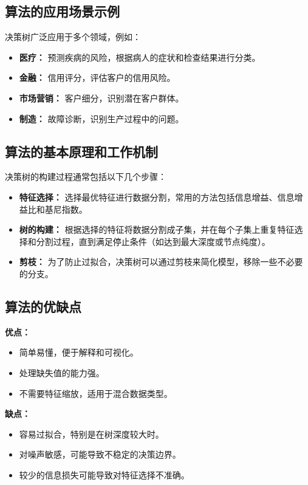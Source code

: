 \subsection*{算法的应用场景示例}
决策树广泛应用于多个领域，例如：
\begin{itemize}
    \item \textbf{医疗：} 预测疾病的风险，根据病人的症状和检查结果进行分类。
    \item \textbf{金融：} 信用评分，评估客户的信用风险。
    \item \textbf{市场营销：} 客户细分，识别潜在客户群体。
    \item \textbf{制造：} 故障诊断，识别生产过程中的问题。
\end{itemize}

\subsection*{算法的基本原理和工作机制}
决策树的构建过程通常包括以下几个步骤：
\begin{itemize}
    \item \textbf{特征选择：} 选择最优特征进行数据分割，常用的方法包括信息增益、信息增益比和基尼指数。
    \item \textbf{树的构建：} 根据选择的特征将数据分割成子集，并在每个子集上重复特征选择和分割过程，直到满足停止条件（如达到最大深度或节点纯度）。
    \item \textbf{剪枝：} 为了防止过拟合，决策树可以通过剪枝来简化模型，移除一些不必要的分支。
\end{itemize}

\subsection*{算法的优缺点}
\textbf{优点：}
\begin{itemize}
    \item 简单易懂，便于解释和可视化。
    \item 处理缺失值的能力强。
    \item 不需要特征缩放，适用于混合数据类型。
\end{itemize}

\textbf{缺点：}
\begin{itemize}
    \item 容易过拟合，特别是在树深度较大时。
    \item 对噪声敏感，可能导致不稳定的决策边界。
    \item 较少的信息损失可能导致对特征选择不准确。
\end{itemize}

